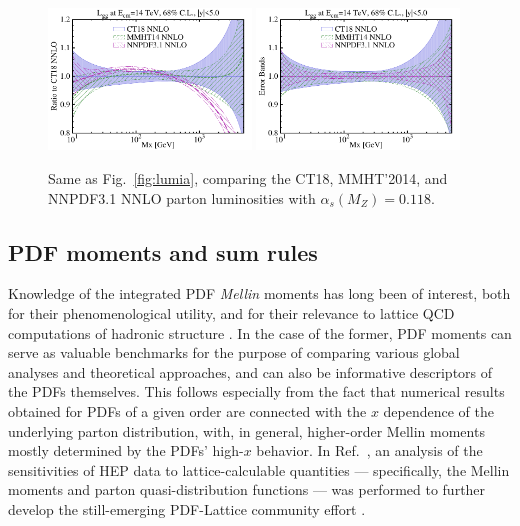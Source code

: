 \begin{figure}[!htbp]
\begin{center}
		\includegraphics[width=0.48\textwidth]{./fig/Lumi_CT18NNLO_MMHT_NNPDF31/Lumi_14TeV_ym-lt-5-0_asym_30__68CL-CT18NNLO_MMHT2014nnlo_NNPDF31nnloas01181000__00_ggr_ect.pdf}
		\includegraphics[width=0.48\textwidth]{./fig/Lumi_CT18NNLO_MMHT_NNPDF31/Lumi_14TeV_ym-lt-5-0_asym_30__68CL-CT18NNLO_MMHT2014nnlo_NNPDF31nnloas01181000__00_gg2_ect.pdf}

	\end{center}
	\vspace{-2ex}
	\caption{Same as Fig.~\ref{fig:lumia}, comparing the CT18,
          MMHT'2014, and NNPDF3.1 NNLO parton luminosities with
          $\alpha_s(M_Z)=0.118$.  
	}
\label{fig:lumiCT18NNLOvsothers}
\end{figure}


\clearpage


%
\subsection{PDF moments and sum rules}
\label{sec:moments}
%
%


Knowledge of the integrated PDF {\it Mellin} moments has long been of interest, both for their phenomenological
utility, and for their relevance to lattice QCD computations of hadronic structure \cite{Lin:2017snn,Hobbs:2019gob}.
In the case of the former, PDF moments can serve as valuable benchmarks for the purpose of comparing various global
analyses and theoretical approaches, and can also be informative descriptors of the PDFs themselves. This follows
especially from the fact that numerical results obtained for PDFs of a given order are connected with the $x$
dependence of the underlying parton distribution, with, in general, higher-order Mellin moments mostly determined
by the PDFs' high-$x$ behavior.  In Ref.~\cite{Hobbs:2019gob}, an analysis of the sensitivities of HEP data to
lattice-calculable quantities --- specifically, the Mellin moments and parton quasi-distribution functions --- was
performed to further develop the still-emerging PDF-Lattice community effort \cite{Lin:2017snn}. 
%

